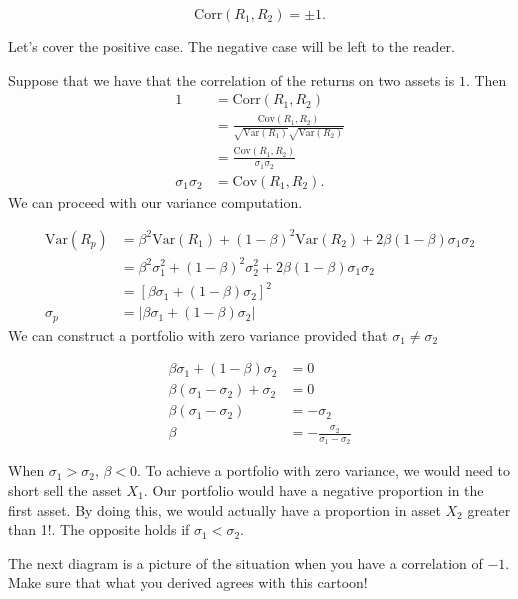 \documentclass{ximera}
\begin{document}
\begin{equation*}
\text{Corr}(R_1,R_2)=\pm 1.
\end{equation*}

Let's cover the positive case. The negative case will be left to the reader.

\begin{example}
Suppose that we have that the correlation of the returns on two assets is $1$. Then
	\begin{align*}
	1				&=\text{Corr}(R_1, R_2)\\
				 	&=\frac{\text{Cov}(R_1, R_2)}{\sqrt{\text{Var}(R_1)}{\sqrt{\text{Var}(R_2)}}}\\
					&=\frac{\text{Cov}(R_1, R_2)}{\sigma_1\sigma_2}\\
	\sigma_1\sigma_2 		&=\text{Cov}(R_1, R_2).
	\end{align*}
We can proceed with our variance computation.

	\begin{align*}
	\text{Var}(R_p) 	&=\beta^2\text{Var}(R_1)+(1-\beta)^2\text{Var}(R_2)+2\beta(1-\beta)\sigma_1\sigma_2\\
				&=\beta^2\sigma_1^2+(1-\beta)^2\sigma_2^2+2\beta(1-\beta)\sigma_1\sigma_2\\
				&=[\beta\sigma_1+(1-\beta)\sigma_2]^2\\
	\sigma_p 		&=|\beta\sigma_1+(1-\beta)\sigma_2|
	\end{align*}
We can construct a portfolio with zero variance provided that $\sigma_1\not=\sigma_2$

	\begin{align*}
 	\beta\sigma_1+(1-\beta)\sigma_2 	&=0\\
	\beta(\sigma_1-\sigma_2)+\sigma_2 	&=0\\
	\beta(\sigma_1-\sigma_2) 			&=-\sigma_2\\
	\beta 						&=-\frac{\sigma_2}{\sigma_1-\sigma_2}
	\end{align*}

When $\sigma_1>\sigma_2$, $\beta<0$. To achieve a portfolio with zero variance, we would need to short sell the asset $X_1$. Our portfolio would have a negative proportion in the first asset. By doing this, we would actually have a proportion in asset $X_2$ greater than 1!. The opposite holds if $\sigma_1<\sigma_2$. 
\end{example}

The next diagram is a picture of the situation when you have a correlation of $-1$. Make sure that what you derived agrees with this cartoon!
\end{document}
